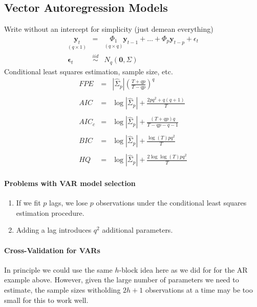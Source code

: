 \documentclass[12pt]{article}
\theoremstyle{definition}
\begin{document}
\subsection{Vector Autoregression Models}
Write without an intercept for simplicity (just demean everything)
	\begin{eqnarray*}
		\underset{(q\times 1)}{\textbf{y}_t} &=& \underset{(q\times q)}{\Phi_1} \textbf{y}_{t-1} + \hdots + \Phi_{p}\textbf{y}_{t-p} + \epsilon_t\\
		\boldsymbol{\epsilon}_t &\overset{iid}{\sim}& N_q(\mathbf{0}, \Sigma)
	\end{eqnarray*}
Conditional least squares estimation, sample size, etc.	
\begin{eqnarray*}
	FPE &=& \left| \widehat{\Sigma}_p \right| \left( \frac{T + qp}{T - qp}\right)^q\\ \\
	AIC &=& \log \left| \widehat{\Sigma}_p\right| + \frac{2pq^2 + q(q+1)}{T}\\ \\ 
	AIC_c &=& \log \left| \widehat{\Sigma}_p\right|  + \frac{(T + qp)q}{T - qp - q -1}\\ \\
	BIC &=& \log \left| \widehat{\Sigma}_p\right| +  \frac{\log(T)pq^2}{T}\\ \\ 
	HQ &=& \log \left| \widehat{\Sigma}_p\right| +  \frac{2 \log\log(T)pq^2}{T}
\end{eqnarray*}

\paragraph{Problems with VAR model selection}
	\begin{enumerate}
		\item If we fit $p$ lags, we lose $p$ observations under the conditional least squares estimation procedure.
		\item Adding a lag introduces $q^2$ additional parameters. 
	\end{enumerate}

\paragraph{Cross-Validation for VARs} In principle we could use the same $h$-block idea here as we did for for the AR example above. However, given the large number of parameters we need to estimate, the sample sizes witholding $2h+1$ observations at a time may be too small for this to work well. 
\end{document}
